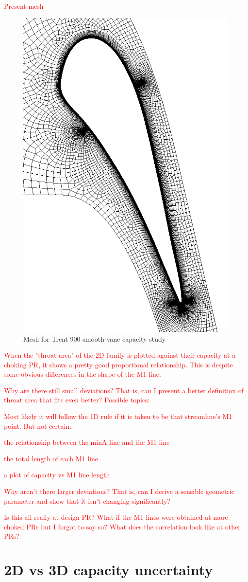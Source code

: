 \documentclass[a4paper, 11pt, twoside]{report}
\begin{document}
\textcolor{red}{Present mesh}
\begin{figure}[H]
      \centering
      \includegraphics[width=.45\textwidth]{figs/T900_smooth_vane_mesh_placeholder.png}
      \caption{Mesh for Trent 900 smooth-vane capacity study}
      \label{fig:T900_mesh_1}
\end{figure}

\textcolor{red}{When the "throat area" of the 2D family is plotted against their capacity at a choking PR, it shows a pretty good proportional relationship. This is despite some obvious differences in the shape of the M1 line.}

\textcolor{red}{Why are there still small deviations? That is, can I present a better definition of throat area that fits even better? Possible topics:}

\textcolor{red}{Most likely it will follow the 1D rule if it is taken to be that streamline's M1 point. But not certain.}
 
\textcolor{red}{the relationship between the minA line and the M1 line}
 
\textcolor{red}{the total length of each M1 line}
 
\textcolor{red}{a plot of capacity vs M1 line length}

\textcolor{red}{Why aren't there larger deviations? That is, can I derive a sensible geometric parameter and show that it isn't changing significantly?}

\textcolor{red}{Is this all really at design PR? What if the M1 lines were obtained at more choked PRs but I forgot to say so? What does the correlation look like at other PRs?}


\section{2D vs 3D capacity uncertainty}
\label{2d_vs_3d_capacity_uncertainty}
\end{document}
